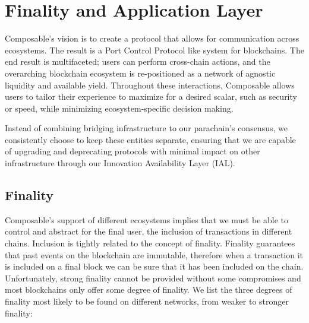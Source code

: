 \section{Finality and Application Layer}
Composable’s vision is to create a protocol that allows for communication across ecosystems. The result is a Port Control Protocol like system for blockchains. The end result is multifaceted; users can perform cross-chain actions, and the overarching blockchain ecosystem is re-positioned as a network of agnostic liquidity and available yield. Throughout these interactions, Composable allows users to tailor their experience to maximize for a desired scalar, such as security or speed, while minimizing ecosystem-specific decision making.

Instead of combining bridging infrastructure to our parachain's consensus, we consistently choose to keep these entities separate, ensuring that we are capable of upgrading and deprecating protocols with minimal impact on other infrastructure through our Innovation Availability Layer (IAL). 

\subsection{Finality}
Composable's support of different ecosystems implies that we must be able to control and abstract for the final user, the inclusion of transactions in different chains. Inclusion is tightly related to the concept of finality. Finality guarantees that past events on the blockchain are immutable, therefore when a transaction it is included on a final block we can be sure that it has been included on the chain. Unfortunately, strong finality cannot be provided without some compromises \cite{Brewer2012Cap} and most blockchains only offer some degree of finality. We list the three degrees of finality most likely to be found on different networks, from weaker to stronger finality:

